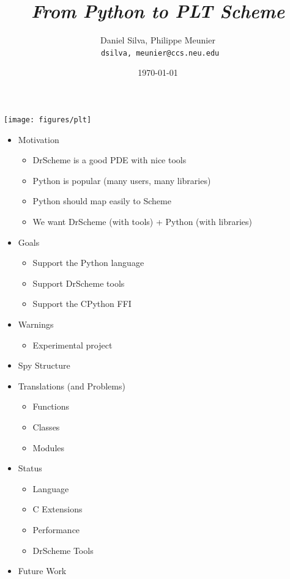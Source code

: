 \documentclass[landscape,20pt,dvips]{foils}
\title{\emph{\color{vinho} From Python to PLT Scheme}}
\author{\color{black} Daniel Silva, Philippe Meunier \\
\texttt{\color{black} \small dsilva, meunier@ccs.neu.edu}}
\date{\today}
\newcommand{\jhead}[1]{\foilhead{\flushleft \textcolor{vinho}{\large   #1}
\vspace{-0.84cm} \\ {\color{black} --------------------------------------------------------------- }}}
\begin{document}

\maketitle

\vspace{1cm}
\centerline{\texttt{[image: figures/plt]}}

\jhead{The Spy Project Motivation and Goals}
\MyLogo{}
\LogoOff

\begin{itemize}
  \item Motivation
  \begin{itemize}
    \item DrScheme is a good PDE with nice tools
    \item Python is popular (many users, many libraries)
    \item Python should map easily to Scheme
    \item We want DrScheme (with tools) + Python (with libraries)
  \end{itemize}
  \item Goals
  \begin{itemize}
    \item Support the Python language
    \item Support DrScheme tools
    \item Support the CPython FFI
  \end{itemize}
  \item Warnings
  \begin{itemize}
    \item Experimental project
  \end{itemize}
\end{itemize}

\jhead{Overview}

\begin{itemize}
  \item Spy Structure
  \item Translations (and Problems)
    \begin{itemize}
      \item Functions
      \item Classes
      \item Modules
    \end{itemize}
  \item Status
    \begin{itemize}
      \item Language
      \item C Extensions
      \item Performance
      \item DrScheme Tools
    \end{itemize}
  \item Future Work
\end{itemize}
\end{document}
